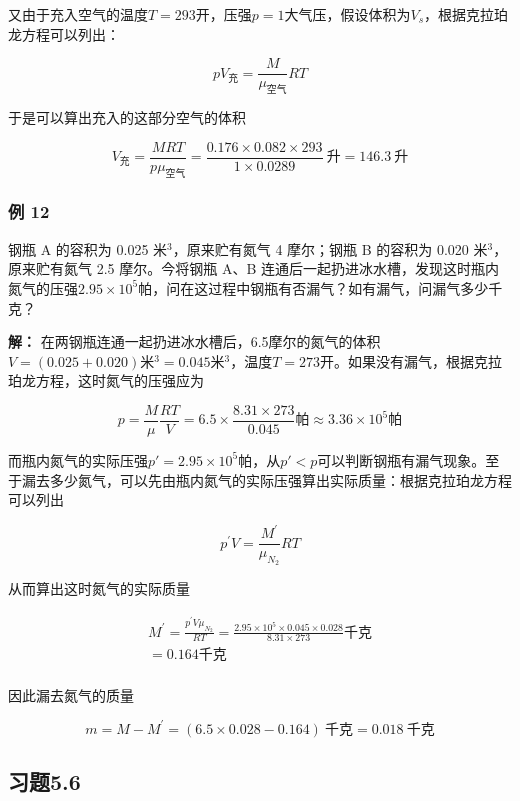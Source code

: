 又由于充入空气的温度\(T = 293\)开，压强\(p = 1\)大气压，假设体积为\(V_{s}\)，根据克拉珀龙方程可以列出：

\[
pV_{\text{充}}=\frac{M}{\mu_{\text{空气}}}RT
\]

于是可以算出充入的这部分空气的体积

\[
V_{\text{充}}=\frac{MRT}{p\mu_{\text{空气}}}=\frac{0.176\times0.082\times293}{1\times0.0289}\ \text{升}=146.3\ \text{升}
\]

\subsubsection{例 12}\label{ux4f8b-12-1}

钢瓶 A 的容积为 0.025 米\(^{3}\)，原来贮有氮气 4 摩尔；钢瓶 B 的容积为
0.020 米\(^{3}\)，原来贮有氮气 2.5 摩尔。今将钢瓶 A、B
连通后一起扔进冰水槽，发现这时瓶内氮气的压强\(2.95 \times 10^{5}\)帕，问在这过程中钢瓶有否漏气？如有漏气，问漏气多少千克？

\textbf{解：}
在两钢瓶连通一起扔进冰水槽后，6.5摩尔的氮气的体积\(V = (0.025 + 0.020)\)米\(^{3} = 0.045\)米\(^{3}\)，温度\(T = 273\)开。如果没有漏气，根据克拉珀龙方程，这时氮气的压强应为

\[
p = \frac {M}{\mu} \frac {R T}{V} = 6.5 \times \frac {8.31 \times 273}{0.045} \text{帕} \approx 3.36 \times 10 ^ {5} \text{帕}
\]

而瓶内氮气的实际压强\(p' = 2.95 \times 10^{5}\)帕，从\(p' < p\)可以判断钢瓶有漏气现象。至于漏去多少氮气，可以先由瓶内氮气的实际压强算出实际质量：根据克拉珀龙方程可以列出

\[
p ^ {\prime} V = \frac {M ^ {\prime}}{\mu_ {N _ {2}}} R T
\]

从而算出这时氮气的实际质量

\[
\begin{array}{l} M ^ {\prime} = \frac {p ^ {\prime} V \mu_ {N _ {2}}}{R T} = \frac {2.95 \times 10 ^ {5} \times 0.045 \times 0.028}{8.31 \times 273} \text{千克} \\ = 0.164 \text{千克} \\ \end{array}
\]

因此漏去氮气的质量

\[
m=M-M^\prime=(6.5\times0.028-0.164)\ \text{千克}=0.018\ \text{千克}
\]

\subsection{习题5.6}\label{ux4e60ux98985.6}

